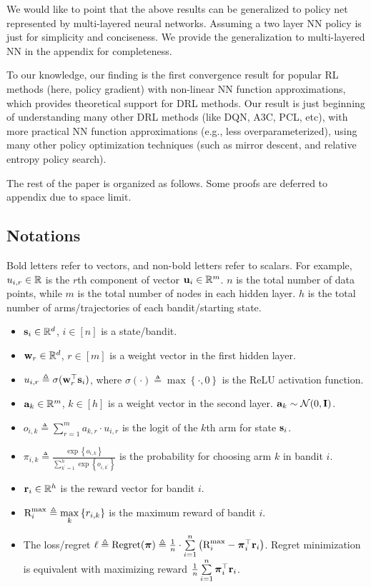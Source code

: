 We would like to point that the above results can be generalized to policy net represented by multi-layered neural networks. Assuming a two layer NN policy is just for simplicity and conciseness. We provide the generalization to multi-layered NN in the appendix for completeness.

To our knowledge, our finding is the first convergence result for popular RL methods (here, policy gradient) with non-linear NN function approximations, which provides theoretical support for DRL methods. Our result is just beginning of understanding many other DRL methods (like DQN, A3C, PCL, etc), with more practical NN function approximations (e.g., less overparameterized), using many other policy optimization techniques (such as mirror descent, and relative entropy policy search).

The rest of the paper is organized as follows. Some proofs are deferred to appendix due to space limit.

\subsection{Notations}

Bold letters refer to vectors, and non-bold letters refer to scalars. For example, $u_{i,r} \in {\mathbb{R}}$ is the $r$th component of vector ${\mathbf{u}}_i \in {\mathbb{R}}^m$. $n$ is the total number of data points, while $m$ is the total number of nodes in each hidden layer. $h$ is the total number of arms/trajectories of each bandit/starting state.

\begin{itemize}
	\item ${\mathbf{s}}_i \in {\mathbb{R}}^d$, $i \in [n]$ is a state/bandit.
	\item ${\mathbf{w}}_r \in {\mathbb{R}}^d$, $r \in [m]$ is a weight vector in the first hidden layer.
	\item $u_{i,r} \triangleq \sigma({\mathbf{w}}_r^\top {\mathbf{s}}_i)$, where $\sigma(\cdot) \triangleq \max\left\{ \cdot, 0 \right\}$ is the ReLU activation function.
	\item ${\mathbf{a}}_k \in {\mathbb{R}}^m$, $k \in [h]$ is a weight vector in the second layer. ${\mathbf{a}}_k \sim {\mathcal{N}}(0, {\mathbf{I}})$.
	\item $o_{i,k} \triangleq \sum\limits_{r=1}^{m}{a_{k,r} \cdot u_{i,r}}$ is the logit of the $k$th arm for state ${\mathbf{s}}_i$.
	\item $\pi_{i,k} \triangleq \frac{\exp\left\{ o_{i,k} \right\}}{\sum\limits_{k^\prime = 1}^{h}{\exp\left\{ o_{i,k^\prime} \right\}}}$ is the  probability for choosing arm $k$ in bandit $i$.
	\item ${\mathbf{r}}_i \in {\mathbb{R}}^h$ is the reward vector for bandit $i$.
	\item ${\text{R}}_i^{\max} \triangleq \max\limits_{k}\left\{ r_{i,k} \right\}$ is the maximum reward of bandit $i$.
	\item The loss/regret $\ell \triangleq {\text{Regret}}({\boldsymbol{\pi}}) \triangleq \frac{1}{n} \cdot \sum\limits_{i=1}^{n}{ \left( {\text{R}}_i^{\max} - {\boldsymbol{\pi}}_i^\top {\mathbf{r}}_i \right) }$. Regret minimization is equivalent with maximizing reward $\frac{1}{n} \sum\limits_{i=1}^{n}{{\boldsymbol{\pi}}_i^\top {\mathbf{r}}_i}$.
\end{itemize}

